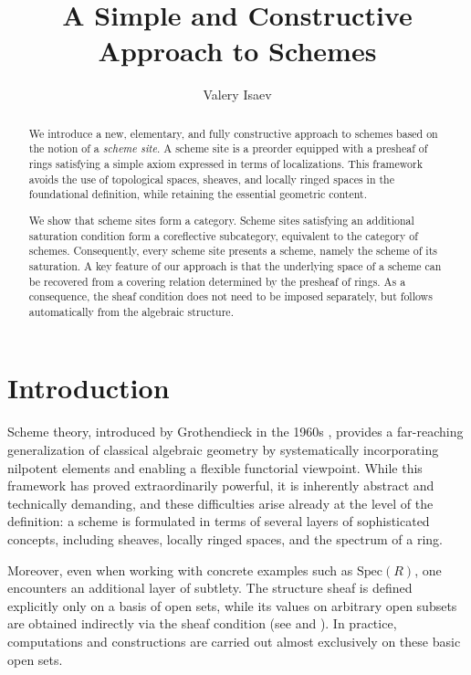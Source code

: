 \documentclass[reqno]{amsart}
\theoremstyle{definition}
\theoremstyle{remark}
\numberwithin{figure}{section}
\begin{document}
\title{A Simple and Constructive Approach to Schemes}

\author{Valery Isaev}

\begin{abstract}
We introduce a new, elementary, and fully constructive approach to schemes based on the notion of a \emph{scheme site}.
A scheme site is a preorder equipped with a presheaf of rings satisfying a simple axiom expressed in terms of localizations.
This framework avoids the use of topological spaces, sheaves, and locally ringed spaces in the foundational definition, while retaining the essential geometric content.

We show that scheme sites form a category.
Scheme sites satisfying an additional saturation condition form a coreflective subcategory, equivalent to the category of schemes.
Consequently, every scheme site presents a scheme, namely the scheme of its saturation.
A key feature of our approach is that the underlying space of a scheme can be recovered from a covering relation determined by the presheaf of rings.
As a consequence, the sheaf condition does not need to be imposed separately, but follows automatically from the algebraic structure.
\end{abstract}

\maketitle

\section{Introduction}

Scheme theory, introduced by Grothendieck in the 1960s \cite{EGA1}, provides a far-reaching generalization of classical algebraic geometry by systematically incorporating nilpotent elements and enabling a flexible functorial viewpoint.
While this framework has proved extraordinarily powerful, it is inherently abstract and technically demanding, and these difficulties arise already at the level of the definition:
a scheme is formulated in terms of several layers of sophisticated concepts, including sheaves, locally ringed spaces, and the spectrum of a ring.

Moreover, even when working with concrete examples such as $\mathrm{Spec}(R)$, one encounters an additional layer of subtlety.
The structure sheaf is defined explicitly only on a basis of open sets,
while its values on arbitrary open subsets are obtained indirectly via the sheaf condition (see \cite[Definition~1.3.4]{EGA1} and \cite[Tag~01HR]{stacks}).
In practice, computations and constructions are carried out almost exclusively on these basic open sets.
\end{document}
